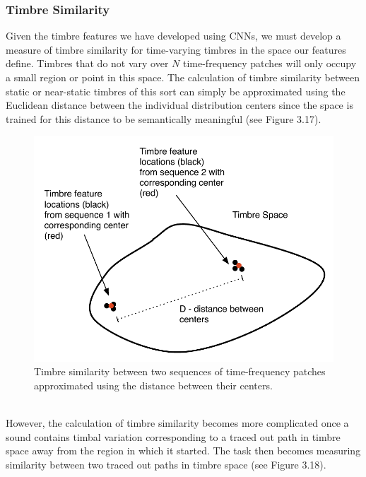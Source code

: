 \documentclass[a4paper,12pt]{report} 	%
\numberwithin{figure}{chapter}
\numberwithin{table}{chapter}
\numberwithin{equation}{chapter}
\begin{document}
\begin{flushleft}
\subsubsection{Timbre Similarity}

Given the timbre features we have developed using CNNs, we must develop a measure of timbre similarity for time-varying timbres in the space our features define. Timbres that do not vary over $N$ time-frequency patches will only occupy a small region or point in this space. The calculation of timbre similarity between static or near-static timbres of this sort can simply be approximated using the Euclidean distance between the individual distribution centers since the space is trained for this distance to be semantically meaningful (see Figure 3.17). 
\begin{figure}[h!]
\begin{center}
\includegraphics[scale=0.8]{TimbreDistance1}
\caption[Timbre Distance Between Centers]{Timbre similarity between two sequences of time-frequency patches approximated using the distance between their centers.}
\end{center}
\end{figure}
\\
However, the calculation of timbre similarity becomes more complicated once a sound contains timbal variation corresponding to a traced out path in timbre space away from the region in which it started. The task then becomes measuring similarity between two traced out paths in timbre space (see Figure 3.18). 
\begin{figure}[h!]
\begin{center}

\end{center}
\end{figure}
\end{flushleft}
\end{document}
